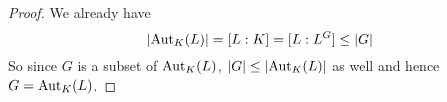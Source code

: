 \documentclass[../book.tex]{subfiles}
\begin{document}
\begin{proof}
        We already have \[
            |\text{Aut}_{K}(L)| = [L : K] = [L : L^G] \leq |G|
        \]
        So since $G$ is a subset of $\text{Aut}_{K}(L)$, 
        $|G| \leq |\text{Aut}_{K}(L)|$ as well and hence $G = \text{Aut}_{K}(L)$.  
\end{proof}

    
\end{document}

